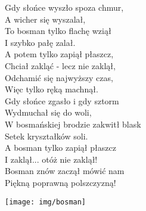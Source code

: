 \begin{multicols}{2}
Gdy słońce wyszło spoza chmur, \\
A wicher się wyszalał, \\
To bosman tylko flachę wziął \\
I szybko pałę zalał. \\

A potem tylko zapiął płaszcz, \\
Chciał zakląć - lecz nie zaklął, \\
Odchamić się najwyższy czas, \\
Więc tylko ręką machnął. \\

Gdy słońce zgasło i gdy sztorm \\
Wydmuchał się do woli, \\
W bosmańskiej brodzie zakwitł blask \\
Setek kryształków soli. \\

A bosman tylko zapiął płaszcz \\
I zaklął... otóż nie zaklął! \\
Bosman znów zaczął mówić nam \\
Piękną poprawną polszczyzną! \\
\end{multicols}

\begin{center}
	\texttt{[image: img/bosman]}
\end{center}
